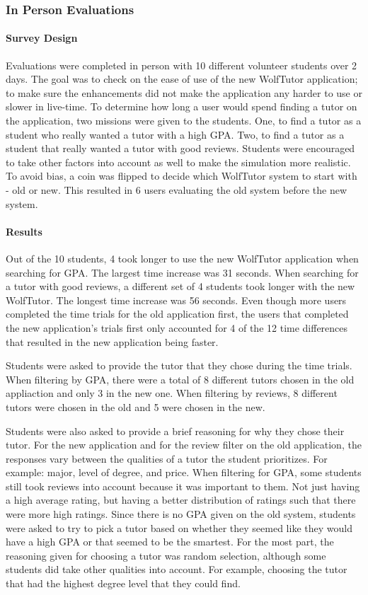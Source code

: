 \subsubsection{In Person Evaluations}

\paragraph{Survey Design}
Evaluations were completed in person with 10 different volunteer students over 2 days.
The goal was to check on the ease of use of the new WolfTutor application; to make sure
the enhancements did not make the application any harder to use or slower in live-time. 
To determine how long a user would spend finding a tutor on the application, two missions were given
to the students. One, to find a tutor as a student who really wanted a tutor with a high GPA. Two, to find a tutor
as a student that really wanted a tutor with good reviews. Students were encouraged to take other factors into account
as well to make the simulation more realistic. To avoid bias, a coin was flipped to decide which WolfTutor system to start with - old or new.
This resulted in 6 users evaluating the old system before the new system. 

\paragraph{Results}
Out of the 10 students, 4 took longer to use the new WolfTutor application when searching for GPA. The largest time
increase was 31 seconds. When searching for a tutor with good reviews, a different set of 4 students took longer with the new
WolfTutor. The longest time increase was 56 seconds. Even though more users completed the time trials
for the old application first, the users that completed the new application's trials first only accounted for 4 of the 
12 time differences that resulted in the new application being faster.

Students were asked to provide the tutor that they chose during the time trials.
When filtering by GPA, there were a total of 8 different tutors chosen in the old appliaction and
only 3 in the new one. When filtering by reviews, 8 different tutors were chosen in the old and 5 were
chosen in the new. 

Students were also asked to provide a brief reasoning for why they chose their tutor.
For the new application and for the review filter on the old application, the responses vary between the qualities of a tutor
the student prioritizes. For example: major, level of degree, and price.  When filtering for GPA, some students still took reviews
into account because it was important to them. Not just having a high average rating, but having a better distribution of ratings such that there
were more high ratings. Since there is no GPA given on the old system, students were asked to try to pick a tutor 
based on whether they seemed like they would have a high GPA or that seemed to be the smartest. For the most part, the reasoning given
for choosing a tutor was random selection, although some students did take other qualities into account.
For example, choosing the tutor that had the highest degree level that they could find.


